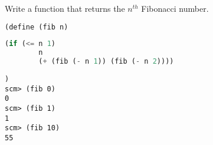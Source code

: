 \question Write a function that returns the $n^{th}$ Fibonacci number.

\begin{lstlisting}[language=Scheme]
(define (fib n)
\end{lstlisting}
\begin{solution}[0.5in]
\begin{lstlisting}[language=Scheme]
    (if (<= n 1)
        n
        (+ (fib (- n 1)) (fib (- n 2))))
\end{lstlisting}
\end{solution}
\begin{lstlisting}
)
scm> (fib 0)
0
scm> (fib 1)
1
scm> (fib 10)
55
\end{lstlisting}

